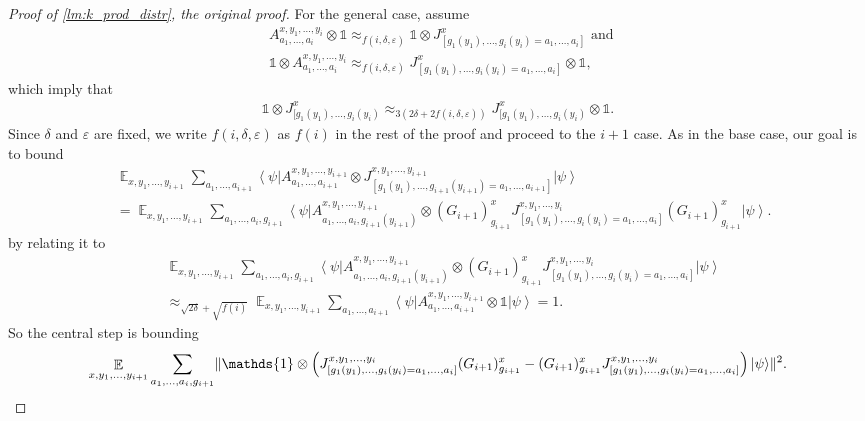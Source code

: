 \documentclass[11pt]{article}
\theoremstyle{plain}
\theoremstyle{definition}
\DeclarePairedDelimiter{\norm}{\lVert}{\rVert}
\newcommand {\bra} [1] {\ensuremath{ \left\langle #1 \right| }}
\newcommand {\ket} [1] {\ensuremath{ \left| #1 \right\rangle }}
\DeclareMathOperator*{\bigE}{\mathbb{E}}
\newcommand {\id} {\ensuremath{\mathds{1}}}
\newcommand{\ep} {\ensuremath{\varepsilon}}
\newcommand{\x}{\otimes}
\newcommand{\appd}[1]{\approx_{#1}}
\newcommand{\1}{\mathbb{1}} %
\begin{document}
\begin{proof}[Proof of \cref{lm:k_prod_distr}, the original proof]
	For the general case, assume 
	\begin{align*}
		& A^{x,y_1,\ldots,y_i}_{a_1,\ldots,a_i} \x \id \appd{f(i,\delta,\ep)}  \id \x J^x_{[g_1(y_1), \ldots , g_i(y_i) 
		= a_1, \ldots, a_i]} \text{ and }\\
		&\id \x A^{x,y_1,\ldots,y_i}_{a_1,\ldots,a_i} \appd{f(i,\delta,\ep)}   J^x_{[g_1(y_1), \ldots , g_i(y_i) 
		= a_1, \ldots, a_i]} \x \id,
	\end{align*}
	which imply that 
	\begin{align*}
		 \id \x J^x_{[g_1(y_1), \ldots , g_i(y_i)} \appd{3( 2 \delta + 2 f(i,\delta, \ep))}  J^x_{[g_1(y_1), \ldots , g_i(y_i)} \x \id.
	\end{align*}
	Since $\delta$ and $\ep$ are fixed, we write $f(i,\delta, \ep)$ as $f(i)$ in the rest of the proof and proceed to the $i+1$ case.
	As in the base case, our goal is to bound
	\begin{align*}
		&\bigE_{x,y_1,\ldots,y_{i+1}} \sum_{a_1,\ldots, a_{i+1}} \bra{\psi} A^{x,y_1,\ldots,y_{i+1}}_{a_1,\ldots,a_{i+1}} \x J^{x,y_1,\ldots,y_{i+1}}_{[g_1(y_1),\ldots,g_{i+1}(y_{i+1}) = a_1, \ldots,a_{i+1}]} \ket{\psi} \\
		&=\bigE_{x,y_1,\ldots, y_{i+1}} \sum_{a_1, \ldots, a_i, g_{i+1} }\bra{\psi} A^{x,y_1,\ldots,y_{i+1}}_{a_1,\ldots, a_i, g_{i+1}(y_{i+1}) } \x 
		 (G_{i+1})^x_{g_{i+1}} J_{[g_1(y_1),\ldots,g_{i}(y_{i}) = a_1, \ldots,a_{i}]}^{x,y_1,\ldots,y_i}   (G_{i+1})^x_{g_{i+1}} \ket{\psi}.
	\end{align*}
	by relating it to
	\begin{align*}
		&\bigE_{x,y_1,\ldots,y_{i+1}} \sum_{a_1, \ldots, a_i, g_{i+1} }\bra{\psi} A^{x,y_1,\ldots, y_{i+1}}_{a_1,\ldots,a_i, g_{i+1}(y_{i+1}) } \x 
		 (G_{i+1})^x_{g_{i+1}}  J_{[g_1(y_1),\ldots,g_{i}(y_{i}) = a_1, \ldots,a_{i}]}^{x,y_1,\ldots,y_i} \ket{\psi}\\
		 & \appd{\sqrt{2\delta} + \sqrt{f(i)} } 
		 \bigE_{x,y_1,\ldots, y_{i+1}} \sum_{a_1, \ldots, a_{i+1}} \bra{\psi} A^{x,y_1,\ldots,y_{i+1}}_{a_1,\ldots, a_{i+1}} \x \id \ket{\psi} = 1.
	\end{align*}
	So the central step is bounding 
	\begin{align*}
		\bigE_{x,y_1,\ldots,y_{i+1}} \sum_{a_1,\ldots,a_i, g_{i+1}} \norm{ \id \x \left( J_{[g_1(y_1),\ldots,g_{i}(y_{i}) = a_1, \ldots,a_{i}]}^{x,y_1,\ldots,y_i}(G_{i+1})^x_{g_{i+1}} - (G_{i+1})^x_{g_{i+1}} J_{[g_1(y_1),\ldots,g_{i}(y_{i}) = a_1, \ldots,a_{i}]}^{x,y_1,\ldots,y_i} \right) \ket{\psi}}^2.
	\end{align*}

\end{proof}
\end{document}
